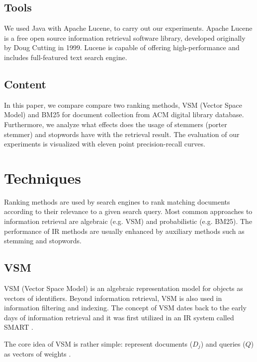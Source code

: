 \FloatBarrier



\subsection{Tools}

We used Java with Apache Lucene, to carry out our experiments. Apache Lucene is a free open source information retrieval software library, developed originally by Doug Cutting in 1999.  Lucene is capable of offering high-performance and includes full-featured text search engine.

\subsection{Content}

In this paper, we compare compare two ranking methods, VSM (Vector Space Model) and BM25 for document collection from ACM digital library database. Furthermore, we analyze what effects does the usage of stemmers (porter stemmer) and stopwords have with the retrieval result. The evaluation of our experiments is visualized with eleven point precision-recall curves. 



\section{Techniques}

Ranking methods are used by search engines to rank matching documents according to their relevance to a given search query. Most common approaches to information retrieval are algebraic (e.g. VSM) and probabilistic (e.g. BM25). The performance of IR methods are usually enhanced by auxiliary methods such as stemming and stopwords.

\subsection{VSM}

VSM (Vector Space Model) is an algebraic representation model for objects as vectors of identifiers. Beyond information retrieval, VSM is also used in information filtering and indexing. The concept of VSM dates back to the early days of information retrieval and it was first utilized in an IR system called SMART \citep{dubin2004most}.

The core idea of VSM is rather simple: represent documents ($D_j$) and queries ($Q$) as vectors of weights \citep{Salton:1975:VSM:361219.361220}.

